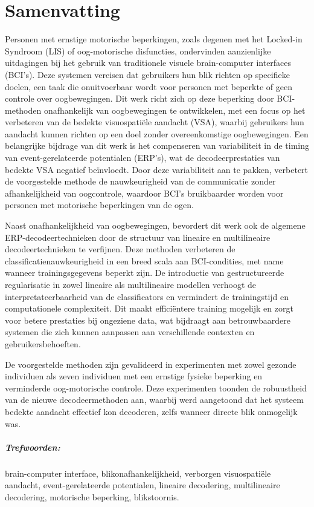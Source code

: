 \chapter*{Samenvatting}

Personen met ernstige motorische beperkingen, zoals degenen met het
Locked-in Syndroom (LIS) of oog-motorische disfuncties, ondervinden
aanzienlijke uitdagingen bij het gebruik van traditionele visuele brain-computer interfaces (BCI's).
Deze systemen vereisen dat gebruikers hun blik richten op specifieke doelen, een taak die
onuitvoerbaar wordt voor personen met beperkte of
geen controle over oogbewegingen.
Dit werk richt zich op deze beperking door
BCI-methoden onafhankelijk van oogbewegingen te ontwikkelen, met een focus op
het verbeteren van de bedekte visuospatiële aandacht (VSA), waarbij gebruikers
hun aandacht kunnen richten op een doel zonder overeenkomstige oogbewegingen.
Een belangrijke bijdrage van dit werk is het compenseren van variabiliteit in
de timing van event-gerelateerde potentialen (ERP's), wat de decodeerprestaties
van bedekte VSA negatief beïnvloedt.
Door deze variabiliteit aan te pakken, verbetert de voorgestelde methode de
nauwkeurigheid van de communicatie zonder afhankelijkheid van oogcontrole,
waardoor BCI's bruikbaarder worden voor personen met motorische beperkingen van
de ogen.

Naast onafhankelijkheid van oogbewegingen, bevordert dit werk ook de algemene
ERP-decodeertechnieken door de structuur van lineaire en multilineaire
decodeertechnieken te verfijnen.
Deze methoden verbeteren de classificatienauwkeurigheid in een breed scala aan
BCI-condities, met name wanneer trainingsgegevens beperkt zijn.
De introductie van gestructureerde regularisatie in zowel lineaire als
multilineaire modellen verhoogt de interpretateerbaarheid van de classificators
en vermindert de trainingstijd en computationele complexiteit.
Dit maakt efficiëntere training mogelijk en zorgt voor betere prestaties bij
ongeziene data, wat bijdraagt aan betrouwbaardere systemen die zich kunnen
aanpassen aan verschillende contexten en gebruikersbehoeften.

De voorgestelde methoden zijn gevalideerd in experimenten met zowel gezonde
individuen als zeven individuen met een ernstige fysieke beperking en verminderde
oog-motorische controle.
Deze experimenten toonden de robuustheid van de nieuwe decodeermethoden aan,
waarbij werd aangetoond dat het systeem bedekte aandacht effectief kon decoderen,
zelfs wanneer directe blik onmogelijk was.

\paragraph{Trefwoorden:} brain-computer interface, blikonafhankelijkheid, verborgen visuospatiële aandacht, event-gerelateerde potentialen, lineaire decodering, multilineaire decodering, motorische beperking, blikstoornis.
